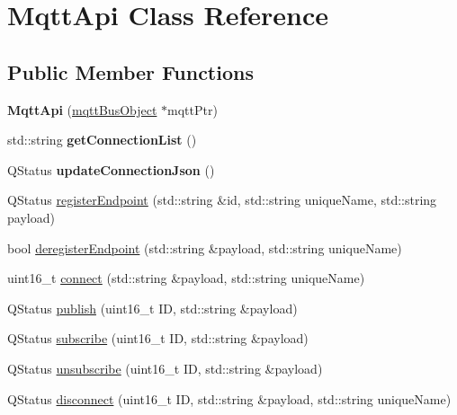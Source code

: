 \hypertarget{classMqttApi}{}\section{Mqtt\+Api Class Reference}
\label{classMqttApi}
\subsection*{Public Member Functions}
\begin{DoxyCompactItemize}
\item 
{\bfseries Mqtt\+Api} (\hyperlink{classmqttBusObject}{mqtt\+Bus\+Object} $\ast$mqtt\+Ptr)\hypertarget{classMqttApi_aeae821eb791a3dea6943062e064c63f2}{}\label{classMqttApi_aeae821eb791a3dea6943062e064c63f2}

\item 
std\+::string {\bfseries get\+Connection\+List} ()\hypertarget{classMqttApi_a989e9c188cd692d44a1905d97739fdf4}{}\label{classMqttApi_a989e9c188cd692d44a1905d97739fdf4}

\item 
Q\+Status {\bfseries update\+Connection\+Json} ()\hypertarget{classMqttApi_aab3524afe9b862f201726a88acb84039}{}\label{classMqttApi_aab3524afe9b862f201726a88acb84039}

\item 
Q\+Status \hyperlink{classMqttApi_a8da0bfabb8ee565df397fc3678c92cfd}{register\+Endpoint} (std\+::string \&id, std\+::string unique\+Name, std\+::string payload)
\item 
bool \hyperlink{classMqttApi_aae0eed0c126822a193618ef2916f9645}{deregister\+Endpoint} (std\+::string \&payload, std\+::string unique\+Name)
\item 
uint16\+\_\+t \hyperlink{classMqttApi_a1dc79b81c5afabdda68f6ff7c7ecc024}{connect} (std\+::string \&payload, std\+::string unique\+Name)
\item 
Q\+Status \hyperlink{classMqttApi_aaa816989dc54ff5b693653c34f2331fc}{publish} (uint16\+\_\+t ID, std\+::string \&payload)
\item 
Q\+Status \hyperlink{classMqttApi_adf2e9e122717619a39dbd8dbb51ffc19}{subscribe} (uint16\+\_\+t ID, std\+::string \&payload)
\item 
Q\+Status \hyperlink{classMqttApi_a282d228cb874ef2fa225e7337162c634}{unsubscribe} (uint16\+\_\+t ID, std\+::string \&payload)
\item 
Q\+Status \hyperlink{classMqttApi_a709193a5f0caf088a9c3d6cdae24effe}{disconnect} (uint16\+\_\+t ID, std\+::string \&payload, std\+::string unique\+Name)
\end{DoxyCompactItemize}


